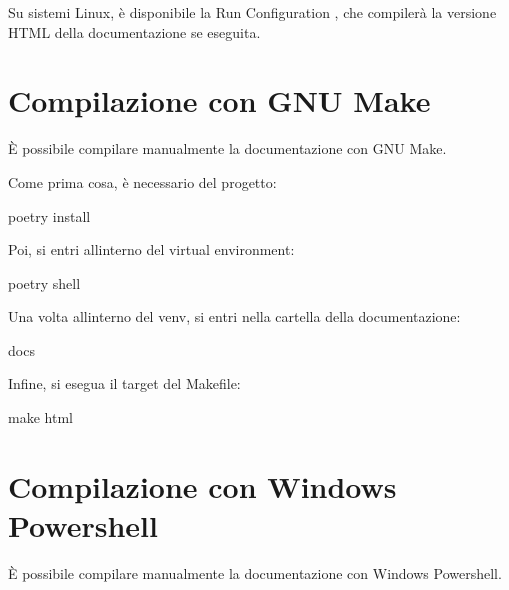 \documentclass[letterpaper,10pt,italian]{sphinxmanual}
\begin{document}
\sphinxAtStartPar
Su sistemi Linux, è disponibile la Run Configuration , che compilerà la versione HTML della documentazione se
eseguita.

\noindent{}


\section{Compilazione con GNU Make}
\label{\detokenize{code/meta/index:compilazione-con-gnu-make}}
\sphinxAtStartPar
È possibile compilare manualmente la documentazione con GNU Make.

\sphinxAtStartPar
Come prima cosa, è necessario {\hyperref[\detokenize{guide/installation:installare-le-dipendenze-python}]{}} del progetto:

\begin{sphinxVerbatim}[commandchars=\\\{\}]
poetry install
\end{sphinxVerbatim}

\sphinxAtStartPar
Poi, si entri all\textquotesingle{}interno del virtual environment:

\begin{sphinxVerbatim}[commandchars=\\\{\}]
poetry shell
\end{sphinxVerbatim}

\sphinxAtStartPar
Una volta all\textquotesingle{}interno del venv, si entri nella cartella della documentazione:

\begin{sphinxVerbatim}[commandchars=\\\{\}]
 docs
\end{sphinxVerbatim}

\sphinxAtStartPar
Infine, si esegua il target  del Makefile:

\begin{sphinxVerbatim}[commandchars=\\\{\}]
make html
\end{sphinxVerbatim}


\section{Compilazione con Windows Powershell}
\label{\detokenize{code/meta/index:compilazione-con-windows-powershell}}
\sphinxAtStartPar
È possibile compilare manualmente la documentazione con Windows Powershell.
\end{document}
